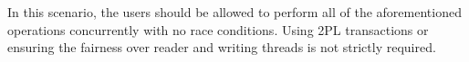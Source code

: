 \documentclass{article}
\begin{document}
In this scenario, the users should be allowed to perform all of the aforementioned operations concurrently with no race conditions. Using 2PL transactions or ensuring the fairness over reader and writing threads is not strictly required. 
%
%
%
%
	
\end{document}
